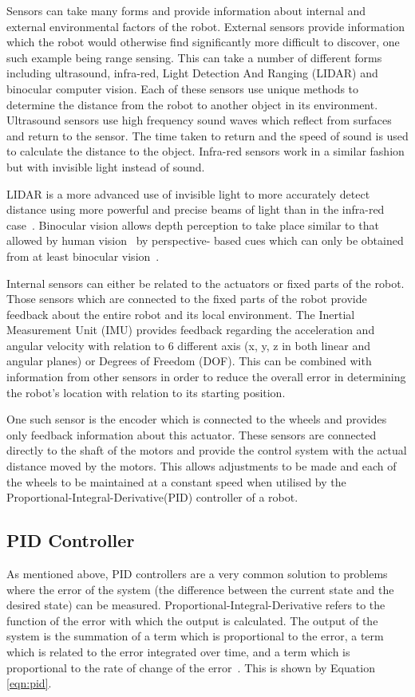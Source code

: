 Sensors can take many forms and provide information about internal and external 
environmental factors of the robot. External sensors provide information which 
the robot would otherwise find significantly more difficult to discover, one 
such example being range sensing. This can take a number of different forms 
including ultrasound, infra-red, Light Detection And Ranging (LIDAR) and 
binocular computer vision. Each of these sensors use unique methods to determine 
the distance from the robot to another object in its environment. Ultrasound 
sensors use high frequency sound waves which reflect from surfaces and return 
to the sensor. The time taken to return and the speed of sound is used to 
calculate the distance to the object. Infra-red sensors work in a similar 
fashion but with invisible light instead of sound. 

LIDAR is a more advanced use of invisible light to more accurately detect 
distance using more powerful and precise beams of light than in the infra-red 
case~\cite{lidar}. Binocular vision allows depth perception to take place 
similar to that allowed by human vision~\cite{read2005early} by perspective-
based cues which can only be obtained from at least binocular 
vision~\cite{pfautz2002depth}. 

Internal sensors can either be related to the actuators or fixed parts of the 
robot. Those sensors which are connected to the fixed parts of the robot provide 
feedback about the entire robot and its local environment. The Inertial 
Measurement Unit (IMU) provides feedback regarding the acceleration and angular 
velocity with relation to 6 different axis (x, y, z in both linear and angular 
planes) or Degrees of Freedom (DOF). This can be combined with information from 
other sensors in order to reduce the overall error in determining the robot's 
location with relation to its starting position.  

One such sensor is the encoder which is connected to the wheels and provides 
only feedback information about this actuator. These sensors are connected 
directly to the shaft of the motors and provide the control system with the 
actual distance moved by the motors. This allows adjustments to be made and each 
of the wheels to be maintained at a constant speed when utilised by the 
Proportional-Integral-Derivative(PID) controller of a robot.  

\subsection{PID Controller}\label{litreview/robotics/pid}
As mentioned above, PID controllers are a very common solution to problems where the error of the 
system (the difference between the current state and the desired state) can be 
measured. Proportional-Integral-Derivative refers to the 
function of the error with which the output is calculated. The output of the 
system is the summation of a term which is proportional to the error, a term 
which is related to the error integrated over time, and a term which is 
proportional to the rate of change of the error~\cite{aastrom2006advanced}. This is shown by Equation \ref{eqn:pid}.

